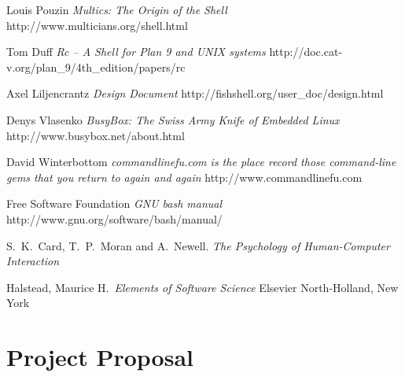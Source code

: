 \documentclass[12pt,twoside,notitlepage]{report}
\begin{document}
\begin{thebibliography}{8} %

  Louis Pouzin
  \emph{Multics: The Origin of the Shell}
  http://www.multicians.org/shell.html

  Tom Duff
  \emph{Rc -- A Shell for Plan 9 and UNIX systems}
  http://doc.cat-v.org/plan\_9/4th\_edition/papers/rc

  Axel Liljencrantz
  \emph{Design Document}
  http://fishshell.org/user\_doc/design.html

  Denys Vlasenko
  \emph{BusyBox: The Swiss Army Knife of Embedded Linux}
  http://www.busybox.net/about.html

  David Winterbottom
  \emph{commandlinefu.com is the place record those command-line gems that
  you return to again and again}
  http://www.commandlinefu.com

  Free Software Foundation
  \emph{GNU bash manual}
  http://www.gnu.org/software/bash/manual/

  S.\ K.\ Card, T.\ P.\ Moran and A.\ Newell. 
  \emph{The Psychology of Human-Computer Interaction}

  Halstead, Maurice H.\ 
  \emph{Elements of Software Science}
  Elsevier North-Holland, New York

\end{thebibliography}
\cleardoublepage

\appendix

\chapter{Project Proposal}

\parindent 0pt
\parskip 6pt

\end{document}
